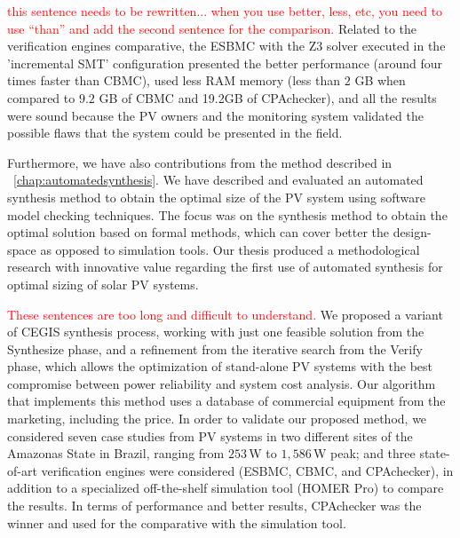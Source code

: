%
\textcolor{red}{this sentence needs to be rewritten... when you use better, less, etc, you need to use ``than'' and add the second sentence for the comparison.}
Related to the verification engines comparative, the ESBMC with the Z3 solver executed in the 'incremental SMT' configuration presented the better performance (around four times faster than CBMC), used less RAM memory (less than $2$ GB when compared to $9.2$ GB of CBMC and 19.2GB of CPAchecker), and all the results were sound because the PV owners and the monitoring system validated the possible flaws that the system could be presented in the field.

Furthermore, we have also contributions from the method described in ~\autoref{chap:automatedsynthesis}. We have described and evaluated an automated synthesis method to obtain the optimal size of the PV system using software model checking techniques. The focus was on the synthesis method to obtain the optimal solution based on formal methods, which can cover better the design-space as opposed to simulation tools. Our thesis produced a methodological research with innovative value regarding the first use of automated synthesis for optimal sizing of solar PV systems.

\textcolor{red}{These sentences are too long and difficult to understand.}
We proposed a variant of CEGIS synthesis process, working with just one feasible solution from the {\sc Synthesize} phase, and a refinement from the iterative search from the {\sc Verify} phase, which allows the optimization of stand-alone PV systems with the best compromise between power reliability and system cost analysis. Our algorithm that implements this method uses a database of commercial equipment from the marketing, including the price. In order to validate our proposed method, we considered seven case studies from PV systems in two different sites of the Amazonas State in Brazil, ranging from $253$\,W to $1,586$\,W peak; and three state-of-art verification engines were considered (ESBMC, CBMC, and CPAchecker), in addition to a specialized off-the-shelf simulation tool (HOMER Pro) to compare the results. In terms of performance and better results, CPAchecker was the winner and used for the comparative with the simulation tool. 

